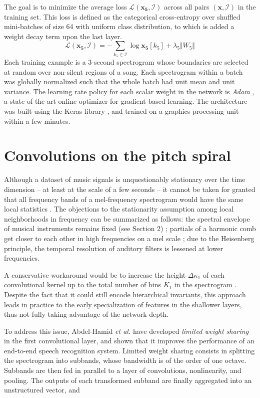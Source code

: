 \documentclass{article}
\makeatletter
\newcommand*{\etal}{\emph{et al.}\@\xspace}
\makeatother
\begin{document}
The goal is to minimize the average loss $\mathscr{L}(\boldsymbol{x_5}, \mathcal{I})$
across all pairs $(\boldsymbol{x}, \mathcal{I})$ in the training set. This loss is defined as
the categorical cross-entropy over shuffled mini-batches of size 64 with uniform
class distribution, to which is added a weight decay term upon the last layer.
\begin{equation}
\mathscr{L}(\boldsymbol{x_5}, \mathcal{I}) =
- \sum_{k_5 \in \mathcal{I}} \log \boldsymbol{x_5}[k_5]
+ \lambda_5 \Vert W_5 \Vert
\end{equation}
Each training example is a 3-second spectrogram whose boundaries are selected at random
over non-silent regions of a song. Each spectrogram within a batch was globally normalized
such that the whole batch had unit mean and unit variance.
The learning rate policy for each scalar weight in the network is \emph{Adam} \cite{Kingma2015},
a state-of-the-art online optimizer for gradient-based learning.
The architecture was built using the Keras library \cite{Chollet2015}, and trained on a graphics
processing unit within a few minutes.

\section{Convolutions on the pitch spiral}
Although a dataset of music signals is unquestionably stationary over the time
dimension -- at least at the scale of a few seconds -- it cannot be taken for granted
that all frequency bands of a mel-frequency spectrogram would have the same
local statistics \cite{Humphrey2013}.
The objections to the stationarity assumption among local neighborhoods in frequency
can be summarized as follows:
the spectral envelope of musical instruments remains fixed (see Section 2) ;
partials of a harmonic comb get closer to each other in high frequencies on a mel scale ;
due to the Heisenberg principle, the temporal resolution of auditory filters is lessened at
lower frequencies.

A conservative workaround would be to increase the height $\Delta \kappa_1$ of each
convolutional kernel up to the total number of bins $K_1$ in the spectrogram \cite{Schluter2014}.
Despite the fact that it could still encode hierarchical invariants, this approach leads in
practice to the early specialization of features in the shallower layers, thus not fully
taking advantage of the network depth.

To address this issue, Abdel-Hamid \etal \cite{Abdel-Hamid2014} have developed
\emph{limited weight sharing} in the first convolutional layer, and shown that it improves
the performance of an end-to-end speech recognition system.
Limited weight sharing consists in splitting the spectrogram into subbands, whose bandwidth
is of the order of one octave.
Subbands are then fed in parallel to a layer of convolutions, nonlinearity, and pooling.
The outputs of each transformed subband are finally aggregated into an unstructured
vector, and 
\end{document}
